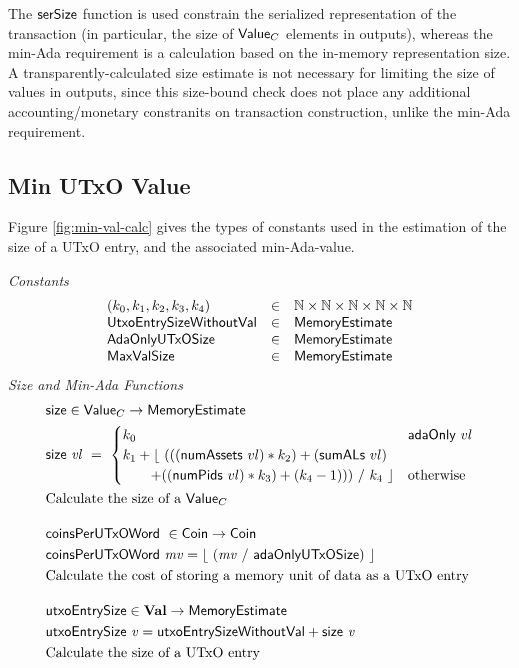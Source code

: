     The $\mathsf{serSize}$ function is used constrain
    the serialized representation of the transaction (in particular, the size
    of $\mathsf{Value}_C$ elements in outputs), whereas the min-Ada requirement is a calculation based on
    the in-memory representation size. A transparently-calculated size estimate
    is not necessary for limiting the size of values in outputs, since this size-bound
    check does not place any additional accounting/monetary constranits on transaction construction,
    unlike the min-Ada requirement.

\subsection{Min UTxO Value}
\label{sec:min-value}

Figure \ref{fig:min-val-calc} gives the types of constants used in the estimation
of the size of a UTxO entry, and the associated min-Ada-value.

\begin{figure*}[h]
  \emph{Constants}
  \begin{equation*}
    \begin{array}{lcl}
      (k_0, k_1, k_2, k_3, k_4) & \in & \mathbb{N} \times \mathbb{N} \times \mathbb{N} \times \mathbb{N} \times \mathbb{N} \\
      \mathsf{UtxoEntrySizeWithoutVal} & \in & \mathsf{MemoryEstimate} \\
      \mathsf{AdaOnlyUTxOSize} & \in & \mathsf{MemoryEstimate} \\
      \mathsf{MaxValSize} & \in & \mathsf{MemoryEstimate} \\
    \end{array}
  \end{equation*}
  \emph{Size and Min-Ada Functions}
  \begin{align*}
    & \fun{size} \in \Value_C \to \MemoryEstimate \\
    & \fun{size}~\var{vl} ~=~
    \begin{cases}
      k_0 & \fun{adaOnly}~vl\\
      k_1 + \lfloor~ (((\fun{numAssets}~vl) * k_2) + (\fun{sumALs}~vl) & \\
      ~~~~~~ + ((\fun{numPids}~vl) * k_3) + (k_4 - 1)))~ /~ k_4~\rfloor & \text{otherwise} \\
    \end{cases} \\
    & \text{Calculate the size of a $\Value_C$}
    \nextdef
    & \fun{coinsPerUTxOWord}~\in \Coin \to \Coin \\
    & \fun{coinsPerUTxOWord}~\var{mv} = \lfloor~ (\var{mv}~/~ \mathsf{adaOnlyUTxOSize})~ \rfloor \\
    & \text{Calculate the cost of storing a memory unit of data as a UTxO entry}
    \nextdef
    & \fun{utxoEntrySize} \in \ValMonoid \to \MemoryEstimate \\
    & \fun{utxoEntrySize}~\var{v} = \mathsf{utxoEntrySizeWithoutVal} + \fun{size}~\var{v} \\
    & \text{Calculate the size of a UTxO entry}
\end{align*}
\caption{Value Size Calculation}
\label{fig:min-val-calc}
\end{figure*}

